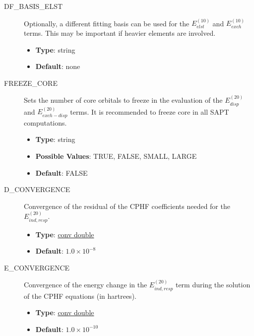\documentclass[letterpaper,10pt,english]{sphinxmanual}
\begin{document}
\begin{description}
\item[{DF\_BASIS\_ELST}] \leavevmode{}\label{index:term-df-basis-elst}
Optionally, a different fitting basis can be used for the
$E_{elst}^{(10)}$ and $E_{exch}^{(10)}$ terms.
This may be important if heavier elements are involved.
\begin{itemize}
\item {} 
\textbf{Type}: string

\item {} 
\textbf{Default}: none

\end{itemize}

\end{description}
\begin{description}
\item[{FREEZE\_CORE}] \leavevmode{}\label{index:term-freeze-core}
Sets the number of core orbitals to freeze in the evaluation
of the $E_{disp}^{(20)}$ and $E_{exch-disp}^{(20)}$
terms. It is recommended to freeze core in all SAPT computations.
\begin{itemize}
\item {} 
\textbf{Type}: string

\item {} 
\textbf{Possible Values}: TRUE, FALSE, SMALL, LARGE

\item {} 
\textbf{Default}: FALSE

\end{itemize}

\end{description}
\begin{description}
\item[{D\_CONVERGENCE}] \leavevmode{}\label{index:term-d-convergence}
Convergence of the residual of the CPHF coefficients needed for
the $E_{ind,resp}^{(20)}$.
\begin{itemize}
\item {} 
\textbf{Type}: {\hyperref[index:conv-double]{conv double}}

\item {} 
\textbf{Default}: $1.0 \times 10^{-8}$

\end{itemize}

\end{description}
\begin{description}
\item[{E\_CONVERGENCE}] \leavevmode{}\label{index:term-e-convergence}
Convergence of the energy change in the $E_{ind,resp}^{(20)}$
term during the solution of the CPHF equations (in hartrees).
\begin{itemize}
\item {} 
\textbf{Type}: {\hyperref[index:conv-double]{conv double}}

\item {} 
\textbf{Default}: $1.0 \times 10^{-10}$

\end{itemize}

\end{description}
\end{document}
